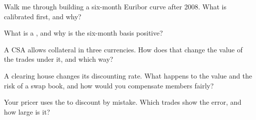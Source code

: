 \begin{interviewq}\label{iq:rc:multi-curve-and-collateral-discounting:2}
Walk me through building a six-month Euribor curve after 2008. What is
calibrated first, and why?
\end{interviewq}

\begin{interviewq}\label{iq:rc:multi-curve-and-collateral-discounting:3}
What is a , and why is the six-month basis positive?
\end{interviewq}

\begin{interviewq}\label{iq:rc:multi-curve-and-collateral-discounting:4}
A CSA allows collateral in three currencies. How does that change the value of
the trades under it, and which way?
\end{interviewq}

\begin{interviewq}\label{iq:rc:multi-curve-and-collateral-discounting:5}
A clearing house changes its discounting rate. What happens to the value and
the risk of a swap book, and how would you compensate members fairly?
\end{interviewq}

\begin{interviewq}\label{iq:rc:multi-curve-and-collateral-discounting:6}
Your pricer uses the  to discount by mistake. Which trades
show the error, and how large is it?
\end{interviewq}
